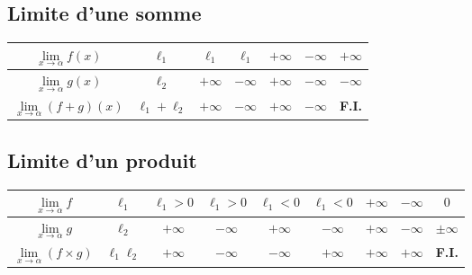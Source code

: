 \documentclass[11pt,a4paper,openany]{book}
\theoremstyle{definition}
\begin{document}
    \subsection{Limite d'une somme}
    \begin{Propriété}
    \begin{center}
    \renewcommand{\arraystretch}{2}
    \begin{tabular}{|c|c|c|c|c|c|c|}
        \hline
        $\lim\limits_{x\to\alpha}f(x)$ & $\ell_1$ & $\ell_1$ & $\ell_1$ & $+\infty$ & $-\infty$ & $+\infty$ \\
        \hline
        $\lim\limits_{x\to\alpha}g(x)$ & $\ell_2$ & $+\infty$ & $-\infty$ & $+\infty$ & $-\infty$ & $-\infty$ \\
        \hline
        $\lim\limits_{x\to\alpha}(f+g)(x)$ & $\ell_1+\ell_2$ & $+\infty$ & $-\infty$ & $+\infty$ & $-\infty$ & \textbf{F.I.} \\
        \hline
    \end{tabular}
    \end{center}
    \end{Propriété}

    \subsection{Limite d'un produit}
    \begin{Propriété}
    \begin{center}
    \renewcommand{\arraystretch}{2}
    \begin{tabular}{|c|c|c|c|c|c|c|c|c|}
        \hline
        $\lim\limits_{x\to\alpha}f$ & $\ell_1$ & $\ell_1>0$ & $\ell_1>0$ & $\ell_1<0$ & $\ell_1<0$ & $+\infty$ & $-\infty$ & $0$ \\
        \hline
        $\lim\limits_{x\to\alpha}g$ & $\ell_2$ & $+\infty$ & $-\infty$ & $+\infty$ & $-\infty$ & $+\infty$ & $-\infty$ & $\pm\infty$ \\
        \hline
        $\lim\limits_{x\to\alpha}(f\times g)$ & $\ell_1\ell_2$ & $+\infty$ & $-\infty$ & $-\infty$ & $+\infty$ & $+\infty$ & $+\infty$ & \textbf{F.I.} \\
        \hline
    \end{tabular}
    \end{center}
    \end{Propriété}
\end{document}
